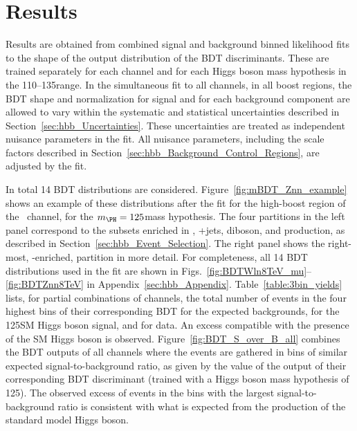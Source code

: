 \documentclass[12pt,twoside,a4paper,cmspaper,final,collab]{cms-tdr}
\begin{document}
\section{Results}\label{sec:hbb_Results}


Results are obtained from combined signal and
background binned likelihood fits to the shape of the output distribution of the BDT
discriminants. These are trained separately for each channel and for each Higgs
boson mass hypothesis in the 110--135\GeV range.
In the simultaneous fit to all channels, in all boost regions, the BDT shape and
normalization for signal and for each background component
are allowed to vary within the systematic and statistical uncertainties described in
Section~\ref{sec:hbb_Uncertainties}. These uncertainties are treated as independent nuisance
parameters in the fit. All nuisance parameters,
including the scale factors described in
Section~\ref{sec:hbb_Background_Control_Regions}, are adjusted
by the fit.


In total 14 BDT distributions are considered. Figure~\ref{fig:mBDT_Znn_example} shows an example of
these distributions after the fit for the high-boost region of the
\ZnnH\ channel, for the  $\mH=125$\GeV  mass
hypothesis. The four partitions in the left panel
correspond to the subsets enriched in \ttbar, {\Vvar}+jets,
diboson, and \VH production, as described in
Section~\ref{sec:hbb_Event_Selection}. The right panel shows
the right-most, \VH-enriched, partition in more detail. For
completeness, all 14 BDT distributions used in the fit are shown in Figs.~\ref{fig:BDTWln8TeV_mu}--\ref{fig:BDTZnn8TeV} in
Appendix~\ref{sec:hbb_Appendix}. Table~\ref{table:3bin_yields} lists, for partial combinations of channels,
the total number of events in the four highest bins of their
corresponding BDT for the expected backgrounds, for the
125\GeV SM Higgs boson signal, and for data. An excess compatible with
the presence of the SM Higgs boson is observed. Figure~\ref{fig:BDT_S_over_B_all}
combines the BDT outputs of all channels where the events
are gathered in bins of similar expected signal-to-background
ratio, as given by the value of the output of their corresponding BDT
discriminant (trained with a Higgs boson mass hypothesis of 125\GeV). The
observed excess of events in the bins with the largest
signal-to-background ratio is consistent with what is expected from
the production of the standard model Higgs boson.
\end{document}
